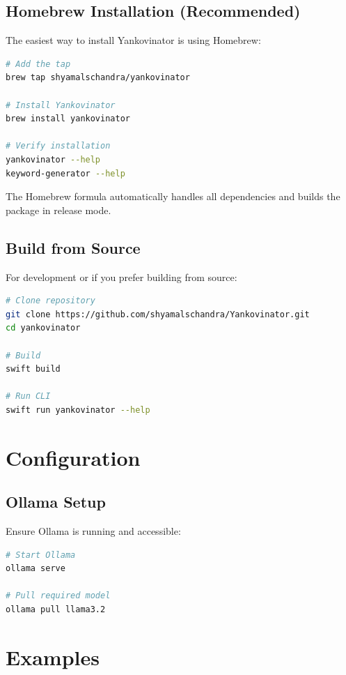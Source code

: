 \documentclass[11pt,a4paper]{article}
\begin{document}
\subsection{Homebrew Installation (Recommended)}

The easiest way to install Yankovinator is using Homebrew:

\begin{lstlisting}[language=bash]
# Add the tap
brew tap shyamalschandra/yankovinator

# Install Yankovinator
brew install yankovinator

# Verify installation
yankovinator --help
keyword-generator --help
\end{lstlisting}

The Homebrew formula automatically handles all dependencies and builds the package in release mode.

\subsection{Build from Source}

For development or if you prefer building from source:

\begin{lstlisting}[language=bash]
# Clone repository
git clone https://github.com/shyamalschandra/Yankovinator.git
cd yankovinator

# Build
swift build

# Run CLI
swift run yankovinator --help
\end{lstlisting}

\section{Configuration}

\subsection{Ollama Setup}

Ensure Ollama is running and accessible:

\begin{lstlisting}[language=bash]
# Start Ollama
ollama serve

# Pull required model
ollama pull llama3.2
\end{lstlisting}

\section{Examples}
\end{document}
